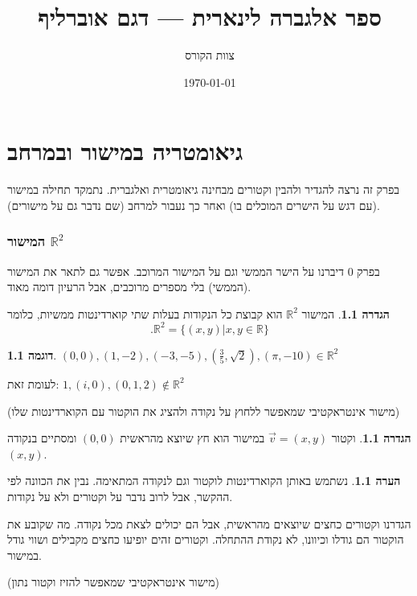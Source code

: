 \documentclass[12pt]{book}
\title{ספר אלגברה לינארית — דגם אוברליף}
\author{צוות הקורס}
\date{\today}
\theoremstyle{plain}
\theoremstyle{definition}
\newtheorem{definition}[theorem]{הגדרה}
\newtheorem{example}[theorem]{דוגמה}
\newtheorem{remark}[theorem]{הערה}
\newcommand{\R}{\mathbb{R}}
\begin{document}
\frontmatter
\maketitle
\tableofcontents
\mainmatter

\chapter{גיאומטריה במישור ובמרחב} 

בפרק זה נרצה להגדיר ולהבין וקטורים מבחינה גיאומטרית ואלגברית. נתמקד תחילה במישור (עם דגש על הישרים המוכלים בו) ואחר כך נעבור למרחב (שם נדבר גם על מישורים).

\subsection{ המישור \(\R^2\)}

בפרק \(0\) דיברנו על הישר הממשי וגם על המישור המרוכב. אפשר גם
לתאר את המישור (הממשי) בלי מספרים מרוכבים, אבל הרעיון דומה מאוד.

\begin{definition}
המישור \(\R^2\) הוא קבוצת כל הנקודות בעלות שתי
קוארדינטות ממשיות, כלומר
\begin{equation*}
	.\mathbb{R}^{2}=\{(x,y)|x,y\in\mathbb{R}\}
\end{equation*}
\end{definition}

\begin{example} \((0,0),(1,-2),(-3,-5),(\frac{3}{5},\sqrt{2}),(\pi,-10)\in\mathbb{R}^{2}\)

לעומת זאת: \(1,(i,0),(0,1,2)\notin\R^{2}\)
\end{example}
\begin{center}
	(מישור אינטראקטיבי שמאפשר ללחוץ על נקודה ולהציג את הוקטור עם הקוארדינטות
	שלו)
\end{center}

\begin{definition}
וקטור \(\vec{v}=(x,y)\) במישור הוא חץ שיוצא מהראשית \((0,0)\)
ומסתיים בנקודה \((x,y)\). 
\end{definition} 

\begin{remark}
נשתמש באותן הקוארדינטות לוקטור וגם לנקודה המתאימה. נבין את הכוונה
לפי ההקשר, אבל לרוב נדבר על וקטורים ולא על נקודות.
\end{remark}

הגדרנו וקטורים כחצים שיוצאים מהראשית, אבל הם יכולים לצאת מכל נקודה.
מה שקובע את הוקטור הם גודלו וכיוונו, לא נקודת ההתחלה. וקטורים זהים יופיעו כחצים מקבילים ושווי גודל במישור.
\begin{center}
	(מישור אינטראקטיבי שמאפשר להזיז וקטור נתון)
\end{center}
\end{document}
